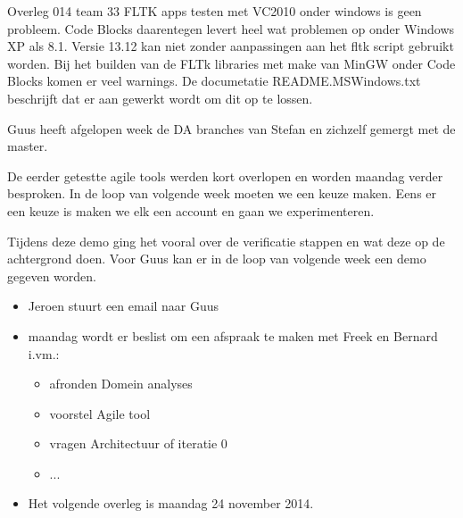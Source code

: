 \documentclass[a4paper,final]{article}
\begin{document}
\begin{Minutes}{Overleg 014 team 33}
FLTK apps testen met VC2010 onder windows is geen probleem. 
Code Blocks daarentegen levert heel wat problemen op onder Windows XP als 8.1. 
Versie 13.12 kan niet zonder aanpassingen aan het fltk script gebruikt worden.
Bij het builden van de FLTk libraries met make van MinGW onder Code Blocks komen
er veel warnings. De documetatie README.MSWindows.txt beschrijft dat er aan
gewerkt wordt om dit op te lossen.



Guus heeft afgelopen week de DA branches van Stefan en zichzelf gemergt met de master.


De eerder getestte agile tools werden kort overlopen en worden maandag verder besproken.  
In de loop van volgende week moeten we een keuze maken. Eens er een keuze is
maken we elk een account en gaan we experimenteren.


Tijdens deze demo ging het
vooral over de verificatie stappen en wat deze op de achtergrond doen.
Voor Guus kan er in de loop van volgende week een demo gegeven worden.

\begin{itemize}
\item Jeroen stuurt een email naar Guus
\item maandag wordt er beslist om een afspraak te maken met Freek en Bernard i.vm.:
\begin{itemize}
\item afronden Domein analyses
\item voorstel Agile tool
\item vragen Architectuur of iteratie 0
\item ...
\end{itemize}
 \item Het volgende overleg is maandag 24 november 2014. 
\end{itemize}


\end{Minutes}
\end{document}
